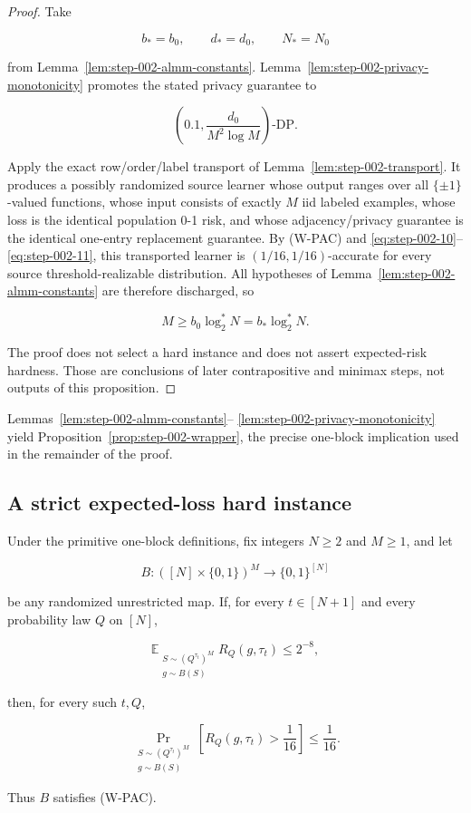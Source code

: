 \begin{proof}
Take

\[
b_*=b_0,\qquad d_*=d_0,\qquad N_*=N_0
\]

from Lemma~\ref{lem:step-002-almm-constants}. Lemma~\ref{lem:step-002-privacy-monotonicity} promotes the stated privacy guarantee to

\[
\left(0.1,\frac{d_0}{M^2\log M}\right)\text{-DP}.
\]

Apply the exact row/order/label transport of Lemma~\ref{lem:step-002-transport}. It produces a possibly randomized source learner whose output ranges over all \(\{\pm1\}\)-valued functions, whose input consists of exactly \(M\) iid labeled examples, whose loss is the identical population 0-1 risk, and whose adjacency/privacy guarantee is the identical one-entry replacement guarantee. By (W-PAC) and \eqref{eq:step-002-10}--\eqref{eq:step-002-11}, this transported learner is \((1/16,1/16)\)-accurate for every source threshold-realizable distribution. All hypotheses of Lemma~\ref{lem:step-002-almm-constants} are therefore discharged, so

\[
M\ge b_0\log_2^*N=b_*\log_2^*N.
\]

The proof does not select a hard instance and does not assert expected-risk hardness. Those are conclusions of later contrapositive and minimax steps, not outputs of this proposition. \end{proof}
Lemmas~\ref{lem:step-002-almm-constants}--
\ref{lem:step-002-privacy-monotonicity} yield
Proposition~\ref{prop:step-002-wrapper}, the precise one-block implication
used in the remainder of the proof.

\subsection{A strict expected-loss hard instance}\label{app:step-003}
\begin{lemma}\label{lem:step-003-markov-bridge}
Under the primitive one-block definitions, fix integers \(N\ge2\) and
\(M\ge1\), and let

\[
B:([N]\times\{0,1\})^M\to\{0,1\}^{[N]}
\]

be any randomized unrestricted map. If, for every \(t\in[N+1]\) and every
probability law \(Q\) on \([N]\),

\[
\mathbb E_{\substack{S\sim(Q^{\tau_t})^M\\g\sim B(S)}}
  R_Q(g,\tau_t)
\le 2^{-8},
\tag{S3.1}\label{eq:step-003-1}
\]

then, for every such \(t,Q\),

\[
\Pr_{\substack{S\sim(Q^{\tau_t})^M\\g\sim B(S)}}
  \left[R_Q(g,\tau_t)>\frac1{16}\right]
\le\frac1{16}.
\tag{S3.2}\label{eq:step-003-2}
\]

Thus \(B\) satisfies (W-PAC).
\end{lemma}

